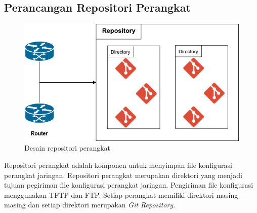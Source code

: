 		\subsection{Perancangan Repositori Perangkat }
			\begin{figure}[H]
				\centering
				\includegraphics[width=\textwidth]{Images/C-3/Repository.png}
				\caption{Desain repositori perangkat}
				\label{DesainRepositoriPerangkat}
			\end{figure}
			Repositori perangkat adalah komponen untuk menyimpan file konfigurasi perangkat jaringan. Repositori perangkat merupakan direktori yang menjadi tujuan pegiriman file konfigurasi perangkat jaringan. Pengiriman file konfigurasi menggunakan TFTP dan FTP. Setiap perangkat memiliki direktori masing-masing dan setiap direktori merupakan \textit{Git Repository}.\\ 

		
            
